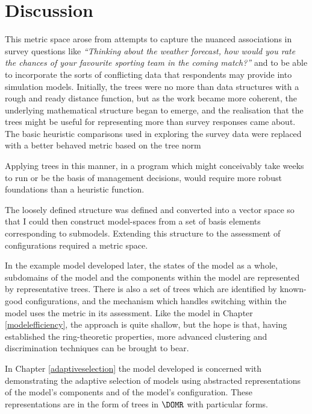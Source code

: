 \section{Discussion}

This metric space arose from attempts to capture the nuanced
associations in survey questions like \textsl{``Thinking about the
  weather forecast, how would you rate the chances of your favourite
  sporting team in the coming match?''\/} and to be able to incorporate
the sorts of conflicting data that respondents may provide into
simulation models. Initially, the trees were no more than data
structures with a rough and ready distance function, but as the
work became more coherent, the underlying mathematical structure began
to emerge, and the realisation that the trees might be useful for
representing more than survey responses came about. The basic
heuristic comparisons used in exploring the survey data were replaced
with a better behaved metric based on the tree norm

Applying trees in
this manner, in a program which might conceivably take weeks to run or
be the basis of management decisions, would require more robust
foundations than a heuristic function.

The loosely defined structure was defined and converted into a vector
space so that I could then construct model-spaces from a set of basis
elements corresponding to submodels. Extending this structure to the
assessment of configurations required a metric space.

In the example model developed later, the states of the model as a
whole, subdomains of the model and the components within the model are
represented by representative trees.  There is also a set of trees
which are identified by known-good configurations, and the
mechanism which handles switching within the model uses the metric in
its assessment.  Like the model in Chapter \ref{modelefficiency}, the
approach is quite shallow, but the hope is that, having established
the ring-theoretic properties, more advanced clustering and
discrimination techniques can be brought to bear.

In Chapter \ref{adaptiveselection} the model developed is concerned with
demonstrating the adaptive selection of models using abstracted
representations of the model's components and of the model's
configuration. These representations are in the form of trees in
$\DOMR$ with particular forms.





